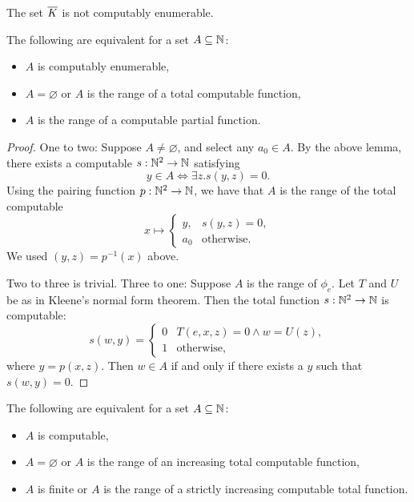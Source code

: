 
\begin{corollary}
  The set $\overline{K}$ is not computably enumerable.
\end{corollary}

\begin{theorem}
  The following are equivalent for a set $A \subseteq \mathbb{N}$:
  \begin{itemize}
  \item $A$ is computably enumerable,
  \item $A = \varnothing$ or $A$ is the range of a total computable function,
  \item $A$ is the range of a computable partial function.
  \end{itemize}
\end{theorem}

\begin{proof}
  One to two:
  Suppose $A \ne \varnothing$, and select any $a_0 \in A$.
  By the above lemma, there exists a computable $s: \mathbb{N}^2 \to \mathbb{N}$ satisfying
  \[
	y \in A \iff \exists z. s(y,z) = 0.
  \]
  Using the pairing function $p: \mathbb{N}^2 \to \mathbb{N}$, we have that $A$ is the range of
  the total computable
  \[
	x \mapsto
	\begin{cases}
	  y, & s(y,z) = 0, \\
	  a_0 & \text{otherwise}.
	\end{cases}
  \]
  We used $(y, z) = p^{-1}(x)$ above.

  Two to three is trivial.
  Three to one:
  Suppose $A$ is the range of $\phi_e$.
  Let $T$ and $U$ be as in Kleene's normal form theorem.
  Then the total function $s: \mathbb{N}^2 \to \mathbb{N}$ is computable:
  \[
	s(w,y) =
	\begin{cases}
	  0 & T(e, x, z) = 0  \land w = U(z), \\
	  1 & \text{otherwise},
	\end{cases}
  \]
  where $y = p(x,z)$.
  Then $w \in A$ if and only if there exists a $y$ such that $s(w,y) = 0$.
\end{proof}


\begin{theorem}
  The following are equivalent for a set $A \subseteq \mathbb{N}$:
  \begin{itemize}
  \item $A$ is computable,
  \item $A = \varnothing$ or $A$ is the range of an increasing total computable
	function,
  \item $A$ is finite or $A$ is the range of a strictly increasing computable
	total function.
  \end{itemize}
\end{theorem}

